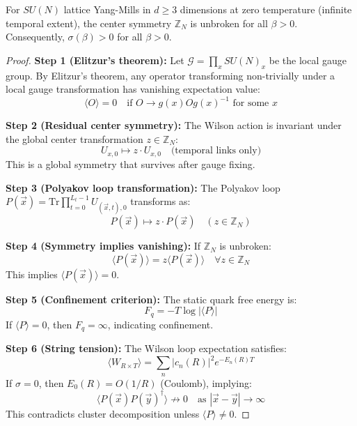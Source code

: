 \begin{theorem}
\label{thm:center_symmetry_confinement}
For $SU(N)$ lattice Yang-Mills in $d \geq 3$ dimensions at zero temperature (infinite temporal extent), the center symmetry $\mathbb{Z}_N$ is unbroken for all $\beta > 0$. Consequently, $\sigma(\beta) > 0$ for all $\beta > 0$.
\end{theorem}

\begin{proof}
\textbf{Step 1 (Elitzur's theorem):}
Let $\mathcal{G} = \prod_x SU(N)_x$ be the local gauge group. By Elitzur's theorem, any operator transforming non-trivially under a local gauge transformation has vanishing expectation value:
\begin{equation}
\langle O \rangle = 0 \quad \text{if } O \to g(x) O g(x)^{-1} \text{ for some } x
\end{equation}

\textbf{Step 2 (Residual center symmetry):}
The Wilson action is invariant under the global center transformation $z \in \mathbb{Z}_N$:
\begin{equation}
U_{x,0} \mapsto z \cdot U_{x,0} \quad \text{(temporal links only)}
\end{equation}
This is a global symmetry that survives after gauge fixing.

\textbf{Step 3 (Polyakov loop transformation):}
The Polyakov loop $P(\vec{x}) = \mathrm{Tr}\prod_{t=0}^{L_t-1} U_{(\vec{x},t),0}$ transforms as:
\begin{equation}
P(\vec{x}) \mapsto z \cdot P(\vec{x}) \quad (z \in \mathbb{Z}_N)
\end{equation}

\textbf{Step 4 (Symmetry implies vanishing):}
If $\mathbb{Z}_N$ is unbroken:
\begin{equation}
\langle P(\vec{x}) \rangle = z \langle P(\vec{x}) \rangle \quad \forall z \in \mathbb{Z}_N
\end{equation}
This implies $\langle P(\vec{x}) \rangle = 0$.

\textbf{Step 5 (Confinement criterion):}
The static quark free energy is:
\begin{equation}
F_q = -T \log |\langle P \rangle|
\end{equation}
If $\langle P \rangle = 0$, then $F_q = \infty$, indicating confinement.

\textbf{Step 6 (String tension):}
The Wilson loop expectation satisfies:
\begin{equation}
\langle W_{R \times T} \rangle = \sum_n |c_n(R)|^2 e^{-E_n(R) T}
\end{equation}
If $\sigma = 0$, then $E_0(R) = O(1/R)$ (Coulomb), implying:
\begin{equation}
\langle P(\vec{x}) P(\vec{y})^\dagger \rangle \not\to 0 \quad \text{as } |\vec{x} - \vec{y}| \to \infty
\end{equation}
This contradicts cluster decomposition unless $\langle P \rangle \neq 0$.


\end{proof}
